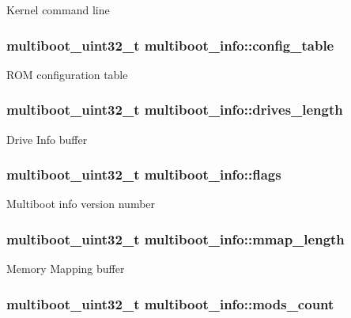 \-Kernel command line \hypertarget{structmultiboot__info_a919ce01f85d05ab90857f8591dfb3948}{
\subsubsection[{config\-\_\-table}]{\setlength{\rightskip}{0pt plus 5cm}multiboot\-\_\-uint32\-\_\-t {\bf multiboot\-\_\-info\-::config\-\_\-table}}}\label{structmultiboot__info_a919ce01f85d05ab90857f8591dfb3948}
\-R\-O\-M configuration table \hypertarget{structmultiboot__info_abe859eaa7e97309f072b3bc1caf5742e}{
\subsubsection[{drives\-\_\-length}]{\setlength{\rightskip}{0pt plus 5cm}multiboot\-\_\-uint32\-\_\-t {\bf multiboot\-\_\-info\-::drives\-\_\-length}}}\label{structmultiboot__info_abe859eaa7e97309f072b3bc1caf5742e}
\-Drive \-Info buffer \hypertarget{structmultiboot__info_aa562865bc325fd785c9fa4c5056294f3}{
\subsubsection[{flags}]{\setlength{\rightskip}{0pt plus 5cm}multiboot\-\_\-uint32\-\_\-t {\bf multiboot\-\_\-info\-::flags}}}\label{structmultiboot__info_aa562865bc325fd785c9fa4c5056294f3}
\-Multiboot info version number \hypertarget{structmultiboot__info_a86a0d881c5233a4b1c8cd690ccd19b75}{
\subsubsection[{mmap\-\_\-length}]{\setlength{\rightskip}{0pt plus 5cm}multiboot\-\_\-uint32\-\_\-t {\bf multiboot\-\_\-info\-::mmap\-\_\-length}}}\label{structmultiboot__info_a86a0d881c5233a4b1c8cd690ccd19b75}
\-Memory \-Mapping buffer \hypertarget{structmultiboot__info_aebdafce31f94277d138202f7b1ec35cc}{
\subsubsection[{mods\-\_\-count}]{\setlength{\rightskip}{0pt plus 5cm}multiboot\-\_\-uint32\-\_\-t {\bf multiboot\-\_\-info\-::mods\-\_\-count}}}\label{structmultiboot__info_aebdafce31f94277d138202f7b1ec35cc}
